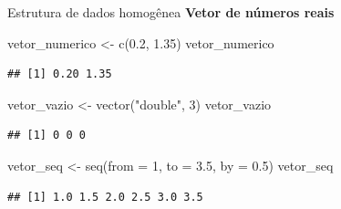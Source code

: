 \documentclass[
  10pt,
  ignorenonframetext,
]{beamer}
\newenvironment{Shaded}{}{}
\newcommand{\DataTypeTok}[1]{#1}
\newcommand{\DecValTok}[1]{#1}
\newcommand{\FloatTok}[1]{#1}
\newcommand{\KeywordTok}[1]{\textcolor[rgb]{0.00,0.00,1.00}{#1}}
\newcommand{\NormalTok}[1]{#1}
\newcommand{\StringTok}[1]{\textcolor[rgb]{0.00,0.50,0.50}{#1}}
\begin{document}
\begin{frame}[fragile]{Estrutura de dados homogênea}
\protect\hypertarget{estrutura-de-dados-homoguxeanea-1}{}
\textbf{Vetor de números reais}

\begin{Shaded}
\begin{Highlighting}[]
\NormalTok{vetor\_numerico  \textless{}{-}}\StringTok{ }\KeywordTok{c}\NormalTok{(}\FloatTok{0.2}\NormalTok{, }\FloatTok{1.35}\NormalTok{)}
\NormalTok{vetor\_numerico}
\end{Highlighting}
\end{Shaded}

\begin{verbatim}
## [1] 0.20 1.35
\end{verbatim}

\begin{Shaded}
\begin{Highlighting}[]
\NormalTok{vetor\_vazio \textless{}{-}}\StringTok{ }\KeywordTok{vector}\NormalTok{(}\StringTok{"double"}\NormalTok{, }\DecValTok{3}\NormalTok{)}
\NormalTok{vetor\_vazio}
\end{Highlighting}
\end{Shaded}

\begin{verbatim}
## [1] 0 0 0
\end{verbatim}

\begin{Shaded}
\begin{Highlighting}[]
\NormalTok{vetor\_seq \textless{}{-}}\StringTok{ }\KeywordTok{seq}\NormalTok{(}\DataTypeTok{from =} \DecValTok{1}\NormalTok{, }\DataTypeTok{to =} \FloatTok{3.5}\NormalTok{, }\DataTypeTok{by =} \FloatTok{0.5}\NormalTok{)}
\NormalTok{vetor\_seq}
\end{Highlighting}
\end{Shaded}

\begin{verbatim}
## [1] 1.0 1.5 2.0 2.5 3.0 3.5
\end{verbatim}
\end{frame}
\end{document}
